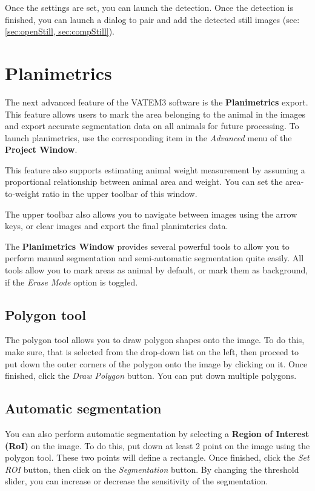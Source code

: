 \documentclass[10pt,a4paper,oneside]{report}             %
\begin{document}
Once the settings are set, you can launch the detection. Once the detection is finished, you can launch a dialog to pair and add the detected still images (see: \autoref{sec:openStill, sec:compStill}).

\section{Planimetrics}

The next advanced feature of the VATEM3 software is the \textbf{Planimetrics }export. This feature allows users to mark the area belonging to the animal in the images and export accurate segmentation data on all animals for future processing. To launch planimetrics, use the corresponding item in the \textit{Advanced} menu of the \textbf{Project Window}.

This feature also supports estimating animal weight measurement by assuming a proportional relationship between animal area and weight. You can set the area-to-weight ratio in the upper toolbar of this window. 

The upper toolbar also allows you to navigate between images using the arrow keys, or clear images and export the final planimterics data. 

The \textbf{Planimetrics Window} provides several powerful tools to allow you to perform manual segmentation and semi-automatic segmentation quite easily. All tools allow you to mark areas as animal by default, or mark them as background, if the \textit{Erase Mode} option is toggled.

\subsection{Polygon tool}

The polygon tool allows you to draw polygon shapes onto the image. To do this, make sure, that  is selected from the drop-down list on the left, then proceed to put down the outer corners of the polygon onto the image by clicking on it. Once finished, click the \textit{Draw Polygon} button. You can put down multiple polygons.

\subsection{Automatic segmentation}

You can also perform automatic segmentation by selecting a \textbf{Region of Interest (RoI)} on the image. To do this, put down at least 2 point on the image using the polygon tool. These two points will define a rectangle. Once finished, click the \textit{Set ROI} button, then click on the \textit{Segmentation} button. By changing the threshold slider, you can increase or decrease the sensitivity of the segmentation.
\end{document}
